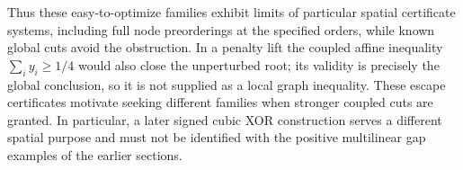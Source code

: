 Thus these easy-to-optimize families exhibit limits of particular
spatial certificate systems, including full node preorderings at the
specified orders, while known global cuts avoid the obstruction. In a
penalty lift the coupled affine inequality $\sum_i y_i\ge1/4$ would
also close the unperturbed root; its validity is precisely the global
conclusion, so it is not supplied as a local graph inequality.
These escape certificates motivate seeking different families when
stronger coupled cuts are granted. In particular, a later signed cubic
XOR construction serves a different spatial purpose and must not be
identified with the positive multilinear gap examples of the earlier
sections.
